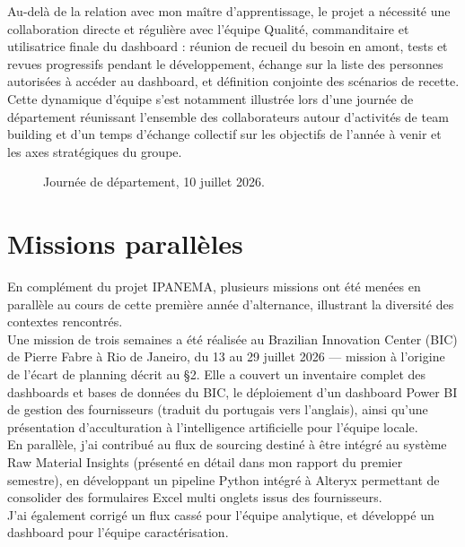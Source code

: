 Au-delà de la relation avec mon maître d'apprentissage, le projet a nécessité une 
collaboration directe et régulière avec l'équipe Qualité, commanditaire et utilisatrice finale du 
dashboard : réunion de recueil du besoin en amont, tests et revues progressifs pendant le 
développement, échange sur la liste des personnes autorisées à accéder au dashboard, et 
définition conjointe des scénarios de recette. \\

Cette dynamique d'équipe s'est notamment illustrée lors d'une journée de département 
réunissant l'ensemble des collaborateurs autour d'activités de team building et d'un temps 
d'échange collectif sur les objectifs de l'année à venir et les axes stratégiques du groupe.

\begin{figure}[H]
    \centering
    \caption{Journée de département, 10 juillet 2026.}
    \label{fig:Journée_de_département}
\end{figure}


\section{Missions parallèles}

En complément du projet IPANEMA, plusieurs missions ont été menées en parallèle au 
cours de cette première année d'alternance, illustrant la diversité des contextes rencontrés. \\

Une mission de trois semaines a été réalisée au Brazilian Innovation Center (BIC) de 
Pierre Fabre à Rio de Janeiro, du 13 au 29 juillet 2026 — mission à l'origine de l'écart de 
planning décrit au §2. Elle a couvert un inventaire complet des dashboards et bases de 
données du BIC, le déploiement d'un dashboard Power BI de gestion des fournisseurs (traduit 
du portugais vers l'anglais), ainsi qu'une présentation d'acculturation à l'intelligence artificielle 
pour l'équipe locale.\\

En parallèle, j'ai contribué au flux de sourcing destiné à être intégré au système Raw 
Material Insights (présenté en détail dans mon rapport du premier semestre), en développant 
un pipeline Python intégré à Alteryx permettant de consolider des formulaires Excel multi
onglets issus des fournisseurs. \\

J'ai également corrigé un flux cassé pour l'équipe analytique, et développé un dashboard 
pour l'équipe caractérisation. \\


